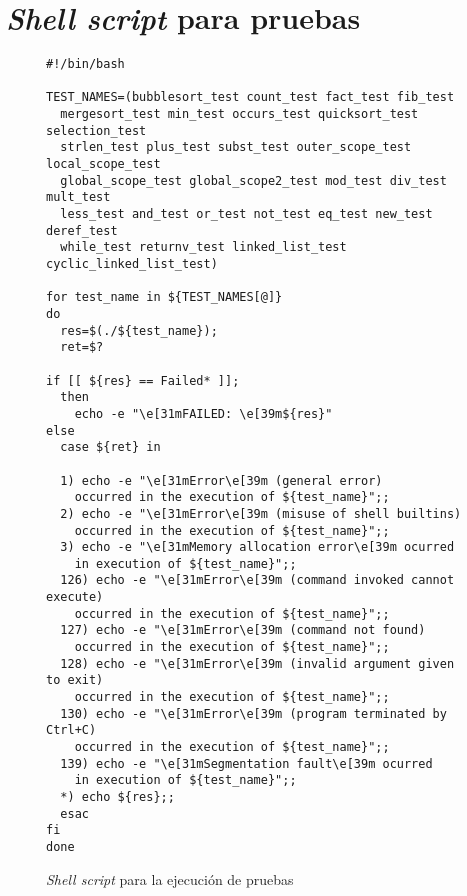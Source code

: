 \chapter{\textit{Shell script} para pruebas}
\label{ap:bash_script}

\begin{figure}
\begin{lstlisting}
#!/bin/bash

TEST_NAMES=(bubblesort_test count_test fact_test fib_test
  mergesort_test min_test occurs_test quicksort_test selection_test
  strlen_test plus_test subst_test outer_scope_test local_scope_test
  global_scope_test global_scope2_test mod_test div_test mult_test
  less_test and_test or_test not_test eq_test new_test deref_test
  while_test returnv_test linked_list_test cyclic_linked_list_test)

for test_name in ${TEST_NAMES[@]}
do
  res=$(./${test_name});
  ret=$?

if [[ ${res} == Failed* ]];
  then
    echo -e "\e[31mFAILED: \e[39m${res}"
else
  case ${ret} in

  1) echo -e "\e[31mError\e[39m (general error)
    occurred in the execution of ${test_name}";;
  2) echo -e "\e[31mError\e[39m (misuse of shell builtins)
    occurred in the execution of ${test_name}";;
  3) echo -e "\e[31mMemory allocation error\e[39m ocurred
    in execution of ${test_name}";;
  126) echo -e "\e[31mError\e[39m (command invoked cannot execute)
    occurred in the execution of ${test_name}";;
  127) echo -e "\e[31mError\e[39m (command not found)
    occurred in the execution of ${test_name}";;
  128) echo -e "\e[31mError\e[39m (invalid argument given to exit)
    occurred in the execution of ${test_name}";;
  130) echo -e "\e[31mError\e[39m (program terminated by Ctrl+C)
    occurred in the execution of ${test_name}";;
  139) echo -e "\e[31mSegmentation fault\e[39m ocurred
    in execution of ${test_name}";;
  *) echo ${res};;
  esac
fi
done
\end{lstlisting}
\caption{\textit{Shell script} para la ejecución de pruebas}
\end{figure}
